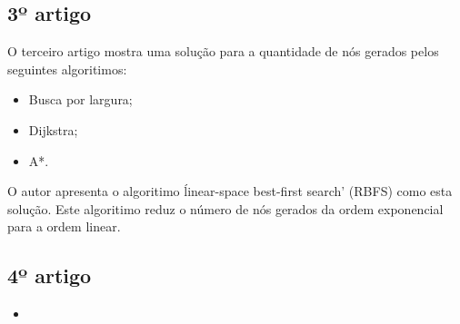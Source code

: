 \documentclass[a4paper]{article}
\begin{document}
\subsection{3º artigo}

O terceiro artigo \cite{Korf1993} mostra uma solução para a quantidade de nós gerados pelos
seguintes algoritimos:

\begin{itemize}

\item Busca por largura;
\item Dijkstra;
\item A*.

\end{itemize}

O autor apresenta o algoritimo \' linear-space best-first search' (RBFS) como esta solução. Este algoritimo reduz o número de nós gerados da ordem exponencial para a ordem linear.

\subsection{4º artigo}

\cite{Dillenburg1994}

\begin{itemize}

\item

\end{itemize}





\end{document}
